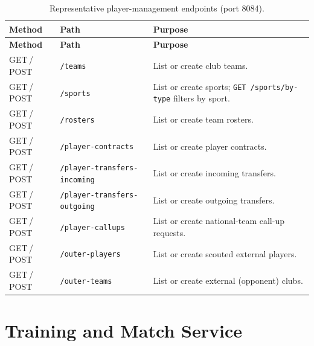 \begin{longtable}{p{} p{} p{}}
\caption{Representative player-management endpoints (port 8084).}
\label{tab:api-player}\\
\toprule
\textbf{Method} & \textbf{Path} & \textbf{Purpose} \\
\midrule
\endfirsthead
\toprule
\textbf{Method} & \textbf{Path} & \textbf{Purpose} \\
\midrule
\endhead
\bottomrule
\endlastfoot
GET\,/\,POST & \texttt{/teams} & List or create club teams. \\
GET\,/\,POST & \texttt{/sports} & List or create sports; \texttt{GET /sports/by-type} filters by sport. \\
GET\,/\,POST & \texttt{/rosters} & List or create team rosters. \\
GET\,/\,POST & \texttt{/player-contracts} & List or create player contracts. \\
GET\,/\,POST & \texttt{/player-transfers-incoming} & List or create incoming transfers. \\
GET\,/\,POST & \texttt{/player-transfers-outgoing} & List or create outgoing transfers. \\
GET\,/\,POST & \texttt{/player-callups} & List or create national-team call-up requests. \\
GET\,/\,POST & \texttt{/outer-players} & List or create scouted external players. \\
GET\,/\,POST & \texttt{/outer-teams} & List or create external (opponent) clubs. \\
\end{longtable}

\section{Training and Match Service}
\label{app:api-training}

